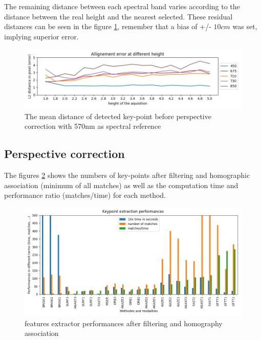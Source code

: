 \documentclass[]{elsarticle}
\begin{document}
	The remaining distance between each spectral band varies according to the distance between the real height and the nearest selected.
	These residual distances can be seen in the figure \ref{fig:affine-error},
	remember that a bias of +/- $10cm$ was set, implying superior error.
	
	\begin{figure}[H]
	\centering
		\includegraphics[width=0.8\linewidth]{../figures/affine-allignement-rmse.jpg}
		\caption{The mean distance of detected key-point before perspective correction with 570nm as spectral reference}
		\label{fig:affine-error}
	\end{figure}
	
	
	\subsection{Perspective correction}
	
	The figures \ref{fig:features-performances} shows the numbers of key-points after filtering and homographic association (minimum of all matches)
	as well as the computation time and performance ratio (matches/time) for each method.
	
	\begin{figure}[H]
		\centering
		\includegraphics[width=0.9\linewidth]{../figures/comparaison-keypoint-performances.png}
		\caption{features extractor performances after filtering and homography association}
		\label{fig:features-performances}
	\end{figure}
	
\end{document}
